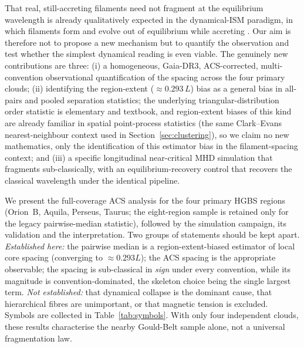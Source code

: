 \documentclass[usenatbib,twoside,twocolumn]{mnras}
\begin{document}
That real, still-accreting filaments need not fragment at the equilibrium wavelength is already qualitatively expected in the dynamical-ISM paradigm, in which filaments form and evolve out of equilibrium while accreting \citep{Andre2014,Clarke2016,Clarke2017,Clarke2020}. Our aim is therefore not to propose a new mechanism but to quantify the observation and test whether the simplest dynamical reading is even viable. The genuinely new contributions are three: (i) a homogeneous, Gaia-DR3, ACS-corrected, multi-convention observational quantification of the spacing across the four primary clouds; (ii) identifying the region-extent ($\approx0.293\,L$) bias as a general bias in all-pairs and pooled separation statistics; the underlying triangular-distribution order statistic is elementary and textbook, and region-extent biases of this kind are already familiar in spatial point-process statistics (the same Clark--Evans nearest-neighbour context used in Section~\ref{sec:clustering}), so we claim no new mathematics, only the identification of this estimator bias in the filament-spacing context; and (iii) a specific longitudinal near-critical MHD simulation that fragments sub-classically, with an equilibrium-recovery control that recovers the classical wavelength under the identical pipeline.

We present the full-coverage ACS analysis for the four primary HGBS regions (Orion~B, Aquila, Perseus, Taurus; the eight-region sample is retained only for the legacy pairwise-median statistic), followed by the simulation campaign, its validation and the interpretation. Two groups of statements should be kept apart. \emph{Established here:} the pairwise median is a region-extent-biased estimator of local core spacing (converging to $\approx0.293L$); the ACS spacing is the appropriate observable; the spacing is sub-classical in \emph{sign} under every convention, while its magnitude is convention-dominated, the skeleton choice being the single largest term. \emph{Not established:} that dynamical collapse is the dominant cause, that hierarchical fibres are unimportant, or that magnetic tension is excluded. Symbols are collected in Table~\ref{tab:symbols}. With only four independent clouds, these results characterise the nearby Gould-Belt sample alone, not a universal fragmentation law.
\end{document}
